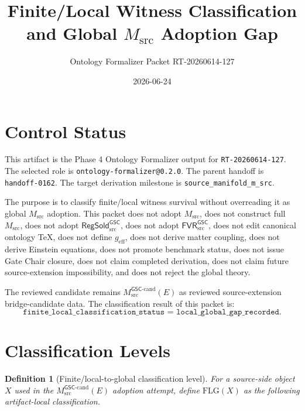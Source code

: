 \documentclass[11pt]{article}
\title{Finite/Local Witness Classification and Global \(M_{\mathrm{src}}\) Adoption Gap}
\author{Ontology Formalizer Packet RT-20260614-127}
\date{2026-06-24}
\newcommand{\GSC}{\mathsf{GSC}}
\newcommand{\Msrc}{M_{\mathrm{src}}}
\newcommand{\Mgsccand}{M_{\mathrm{src}}^{\GSC\mbox{-}\mathrm{cand}}}
\newcommand{\RegSold}{\mathsf{RegSold}_{\mathrm{src}}^{\GSC}}
\newcommand{\FVR}{\mathsf{FVR}_{\mathrm{src}}^{\GSC}}
\newcommand{\geff}{g_{\mathrm{eff}}}
\newtheorem{definition}{Definition}
\begin{document}
\maketitle

\section{Control Status}

This artifact is the Phase 4 Ontology Formalizer output for
\texttt{RT-20260614-127}. The selected role is
\texttt{ontology-formalizer@0.2.0}. The parent handoff is
\texttt{handoff-0162}. The target derivation milestone is
\texttt{source\_manifold\_m\_src}.

The purpose is to classify finite/local witness survival without overreading
it as global \(\Msrc\) adoption. This packet does not adopt \(\Msrc\), does
not construct full \(\Msrc\), does not adopt \(\RegSold\), does not adopt
\(\FVR\), does not edit canonical ontology TeX, does not define \(\geff\),
does not derive matter coupling, does not derive Einstein equations, does not
promote benchmark status, does not issue Gate Chair closure, does not claim
completed derivation, does not claim future source-extension impossibility,
and does not reject the global theory.

The reviewed candidate remains \(\Mgsccand(E)\) as reviewed source-extension
bridge-candidate data. The classification result of this packet is:
\[
  \texttt{finite\_local\_classification\_status =
  local\_global\_gap\_recorded}.
\]

\section{Classification Levels}

\begin{definition}[Finite/local-to-global classification level]
For a source-side object \(X\) used in the \(\Mgsccand(E)\) adoption attempt,
define \(\mathrm{FLG}(X)\) as the following artifact-local classification.
\end{definition}
\end{document}
